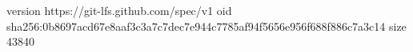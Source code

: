 version https://git-lfs.github.com/spec/v1
oid sha256:0b8697acd67e8aaf3c3a7c7dec7e944c7785af94f5656e956f688f886c7a3c14
size 43840
